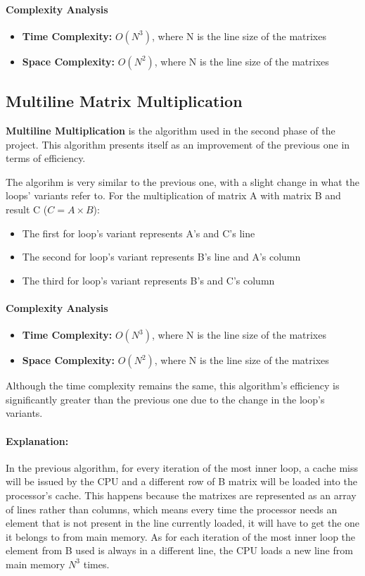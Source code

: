 \paragraph{Complexity Analysis}
\begin{itemize}
    \item \textbf{Time Complexity:} $O(N^3)$, where N is the line size of the matrixes
    \item \textbf{Space Complexity:} $O(N^2)$, where N is the line size of the matrixes
\end{itemize}

\subsection{Multiline Matrix Multiplication}
\textbf{Multiline Multiplication} is the algorithm used in the second phase of the project. This algorithm presents itself as an improvement of the previous one in terms of efficiency.

The algorihm is very similar to the previous one, with a slight change in what the loops' variants refer to. For the multiplication of matrix A with matrix B and result C ($C = A \times B$):

\begin{itemize}
    \item The first for loop's variant represents A's and C's line
    \item The second for loop's variant represents B's line and A's column
    \item The third for loop's variant represents B's and C's column
\end{itemize}

\paragraph{Complexity Analysis}
\begin{itemize}
    \item \textbf{Time Complexity:} $O(N^3)$, where N is the line size of the matrixes
    \item \textbf{Space Complexity:} $O(N^2)$, where N is the line size of the matrixes
\end{itemize}

Although the time complexity remains the same, this algorithm's efficiency is significantly greater than the previous one due to the change in the loop's variants. 

\paragraph{Explanation:} In the previous algorithm, for every iteration of the most inner loop, a cache miss will be issued by the CPU and a different row of B matrix will be loaded into the processor's cache. This happens because the matrixes are represented as an array of lines rather than columns, which means every time the processor needs an element that is not present in the line currently loaded, it will have to get the one it belongs to from main memory. As for each iteration of the most inner loop the element from B used is always in a different line, the CPU loads a new line from main memory $N^3$ times.

